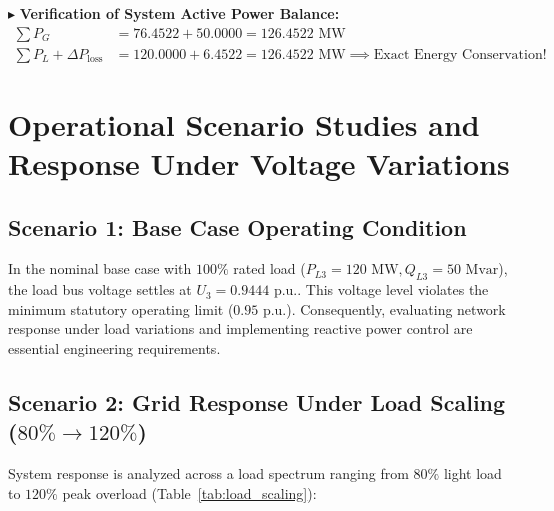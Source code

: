 \documentclass[12pt,a4paper,oneside]{report}
\begin{document}
\noindent $\blacktriangleright$ \textbf{Verification of System Active Power Balance:}
\begin{align}
\sum P_G &= 76.4522 + 50.0000 = 126.4522\text{ MW} \\
\sum P_L + \Delta P_{\text{loss}} &= 120.0000 + 6.4522 = 126.4522\text{ MW} \implies \text{Exact Energy Conservation!}
\end{align}

\chapter{Operational Scenario Studies and Response Under Voltage Variations}

\section{Scenario 1: Base Case Operating Condition}
In the nominal base case with $100\%$ rated load ($P_{L3} = 120\text{ MW}, Q_{L3} = 50\text{ Mvar}$), the load bus voltage settles at $U_3 = 0.9444\text{ p.u.}$. This voltage level violates the minimum statutory operating limit ($0.95\text{ p.u.}$). Consequently, evaluating network response under load variations and implementing reactive power control are essential engineering requirements.

\section{Scenario 2: Grid Response Under Load Scaling ($80\% \to 120\%$)}
System response is analyzed across a load spectrum ranging from $80\%$ light load to $120\%$ peak overload (Table~\ref{tab:load_scaling}):

\begin{table}[H]
\centering
\caption{Three-bus transmission response under load scaling from 80\% to 120\%.}
\label{tab:load_scaling}
\end{table}
\end{document}
